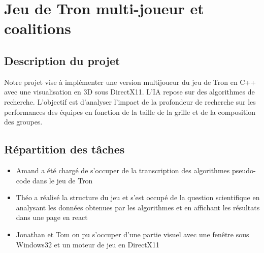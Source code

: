 \section{Jeu de Tron multi-joueur et coalitions}

\tableofcontents

\subsection{Description du projet}
Notre projet vise à implémenter une version multijoueur du jeu de Tron en C++ avec une visualisation en 3D sous DirectX11. L'IA repose sur des algorithmes de recherche. L'objectif est d'analyser l'impact de la profondeur de recherche sur les performances des équipes en fonction de la taille de la grille et de la composition des groupes.

\subsection{Répartition des tâches}
\begin{itemize}
    \item Amand a été chargé de s'occuper de la transcription des algorithmes pseudo-code dans le jeu de Tron
    \item Théo a réalisé la structure du jeu et s'est occupé de la question scientifique en analysant les données obtenues par les algorithmes et en affichant les résultats dans une page en react
    \item Jonathan et Tom on pu s'occuper d'une partie visuel avec une fenêtre sous Windows32 et un moteur de jeu en DirectX11
\end{itemize}

